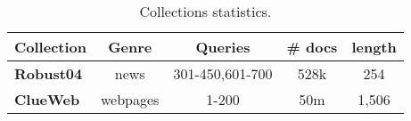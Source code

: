 \begin{table}
\centering
\caption{Collections statistics.}
\vspace{-10pt}
\begin{tabularx}{\linewidth}{Xcccc} 
\toprule
\bf Collection & \bf Genre & \bf Queries & \bf \# docs & \bf length  \\ %
\midrule
\bf Robust04 & news  & 301-450,601-700 & 528k & 254  \\ %
\bf ClueWeb & webpages & 1-200 & 50m & 1,506  \\ 
\bottomrule
\end{tabularx}
\label{tab:data}
\vspace{-15pt}
\end{table}